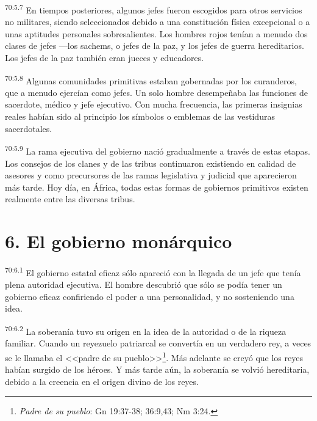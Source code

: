 \par
\textsuperscript{70:5.7} En tiempos posteriores, algunos jefes fueron escogidos para otros servicios no militares, siendo seleccionados debido a una constitución física excepcional o a unas aptitudes personales sobresalientes. Los hombres rojos tenían a menudo dos clases de jefes ---los sachems, o jefes de la paz, y los jefes de guerra hereditarios. Los jefes de la paz también eran jueces y educadores.

\par
\textsuperscript{70:5.8} Algunas comunidades primitivas estaban gobernadas por los curanderos, que a menudo ejercían como jefes. Un solo hombre desempeñaba las funciones de sacerdote, médico y jefe ejecutivo. Con mucha frecuencia, las primeras insignias reales habían sido al principio los símbolos o emblemas de las vestiduras sacerdotales.

\par
\textsuperscript{70:5.9} La rama ejecutiva del gobierno nació gradualmente a través de estas etapas. Los consejos de los clanes y de las tribus continuaron existiendo en calidad de asesores y como precursores de las ramas legislativa y judicial que aparecieron más tarde. Hoy día, en África, todas estas formas de gobiernos primitivos existen realmente entre las diversas tribus.

\section*{6. El gobierno monárquico}
\par
\textsuperscript{70:6.1} El gobierno estatal eficaz sólo apareció con la llegada de un jefe que tenía plena autoridad ejecutiva. El hombre descubrió que sólo se podía tener un gobierno eficaz confiriendo el poder a una personalidad, y no sosteniendo una idea.

\par
\textsuperscript{70:6.2} La soberanía tuvo su origen en la idea de la autoridad o de la riqueza familiar. Cuando un reyezuelo patriarcal se convertía en un verdadero rey, a veces se le llamaba el <<padre de su pueblo>>\footnote{\textit{Padre de su pueblo}: Gn 19:37-38; 36:9,43; Nm 3:24.}. Más adelante se creyó que los reyes habían surgido de los héroes. Y más tarde aún, la soberanía se volvió hereditaria, debido a la creencia en el origen divino de los reyes.

